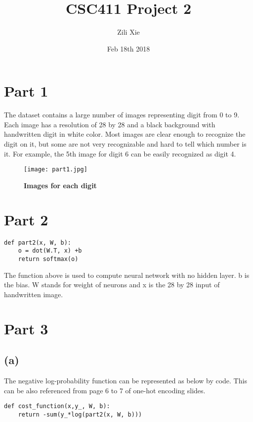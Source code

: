 \documentclass{article}
\title{CSC411 Project 2}
\author{Zili Xie}
\date{Feb 18th 2018}
\begin{document}
\maketitle
\section*{Part 1}
\Large The dataset contains a large number of images representing  digit from 0 to 9. Each image has a resolution of 28 by 28 and a black background with handwritten digit in white color. Most images are clear enough to recognize the digit on it, but some are not very recognizable and hard to tell which number is it. For example, the 5th image for digit 6 can be easily recognized as digit 4.

\begin{figure}[!htb]
  \texttt{[image: part1.jpg]}
  \caption*{\Large \textbf{Images for each digit}} \label{part1}
\end{figure}

\section*{Part 2}

\Large\begin{lstlisting}[basicstyle=\ttfamily]
def part2(x, W, b):
    o = dot(W.T, x) +b
    return softmax(o)

\end{lstlisting}
The function above is used to compute neural network with no hidden layer. b is the bias. W stands for weight of neurons and x is the 28 by 28 input of handwritten image.

\section*{Part 3}
\subsection*{(a)}
The negative log-probability function can be represented as below by code. This can be also referenced from page 6 to 7 of one-hot encoding slides.

\Large\begin{lstlisting}[basicstyle=\ttfamily]
def cost_function(x,y_, W, b):
    return -sum(y_*log(part2(x, W, b)))
\end{lstlisting}
\end{document}
